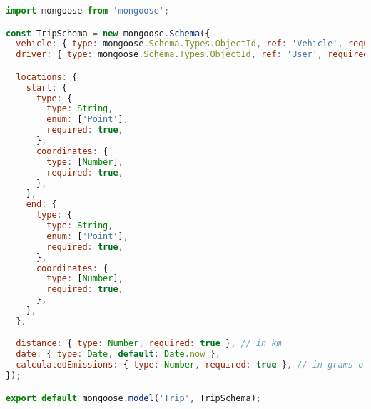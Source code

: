\begin{lstlisting}[language=JavaScript, caption={Source code for \texttt{models/Trip.js}}, breaklines=true]
import mongoose from 'mongoose';

const TripSchema = new mongoose.Schema({
  vehicle: { type: mongoose.Schema.Types.ObjectId, ref: 'Vehicle', required: true },
  driver: { type: mongoose.Schema.Types.ObjectId, ref: 'User', required: true },

  locations: {
    start: {
      type: {
        type: String,
        enum: ['Point'],
        required: true,
      },
      coordinates: {
        type: [Number],
        required: true,
      },
    },
    end: {
      type: {
        type: String,
        enum: ['Point'],
        required: true,
      },
      coordinates: {
        type: [Number],
        required: true,
      },
    },
  },

  distance: { type: Number, required: true }, // in km
  date: { type: Date, default: Date.now },
  calculatedEmissions: { type: Number, required: true }, // in grams of CO2
});

export default mongoose.model('Trip', TripSchema);
\end{lstlisting}
